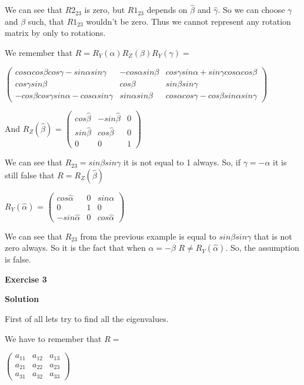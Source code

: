 \documentclass[12pt]{article}
\begin{document}
\begin{list}{()~}{}
We can see that $R2_{23}$ is zero, but $R1_{23}$ depends on $\hat{\beta}$ and $\hat{\gamma}$. So we can choose $\gamma$ and $\beta$ such, that $R1_{23}$ wouldn't be zero. Thus we cannot represent any rotation matrix by only to rotations.
\item
We remember that $R = R_Y(\alpha)R_Z(\beta)R_Y(\gamma) =$

$\left( \begin{array}{ccc}
cos \alpha cos \beta cos \gamma - sin \alpha sin \gamma & - cos \alpha sin \beta & cos \gamma sin \alpha + sin \gamma cos \alpha cos \beta  \\
cos \gamma sin \beta & cos \beta & sin \beta sin \gamma \\
- cos \beta cos \gamma sin \alpha - cos \alpha sin \gamma & sin \alpha sin \beta & cos \alpha cos \gamma - cos \beta sin \alpha sin \gamma \end{array} \right)$

And $R_Z(\hat{\beta})$ = $\left( \begin{array}{ccc}
cos \hat{\beta} & - sin \hat{\beta} & 0 \\
sin \hat{\beta} & cos \hat{\beta} & 0 \\
0 & 0 & 1 \end{array} \right)$

We can see that $R_{23} = sin \beta sin \gamma$ it is not equal to 1 always.
So, if $\gamma = - \alpha$ it is still false that $R = R_Z(\hat{\beta})$
\item
$R_Y(\hat{\alpha})$ = $\left( \begin{array}{ccc}
cos \hat{\alpha} & 0 & sin \hat{\alpha}\\
0 & 1 & 0 \\
- sin \hat{\alpha}& 0 & cos \hat{\alpha} \end{array} \right)$

We can see that $R_{23}$ from the previous example is equal to $sin \beta sin \gamma$ that is not zero always. So it is the fact that when $\alpha = - \beta$ $R \neq R_Y(\hat{\alpha})$. So, the assumption is false.
\end{list}

\textbf{Exercise 3}		
		
\textbf{Solution}

\medskip

First of all lets try to find all the eigenvalues.

We have to remember that $R = $

$\left( \begin{array}{ccc}
a_{11} & a_{12} & a_{13}  \\
a_{21} & a_{22} & a_{23} \\
a_{31} & a_{32} & a_{33} \end{array} \right)$
\end{document}
